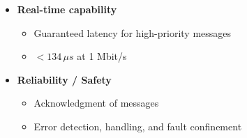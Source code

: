 \begin{itemize}
    \item \textbf{Real-time capability}
    \begin{itemize}
        \item Guaranteed latency for high-priority messages
        \item $< 134\,\mu s$ at 1 Mbit/s
    \end{itemize}

    \item \textbf{Reliability / Safety}
    \begin{itemize}
        \item Acknowledgment of messages
        \item Error detection, handling, and fault confinement
    \end{itemize}

\end{itemize}
